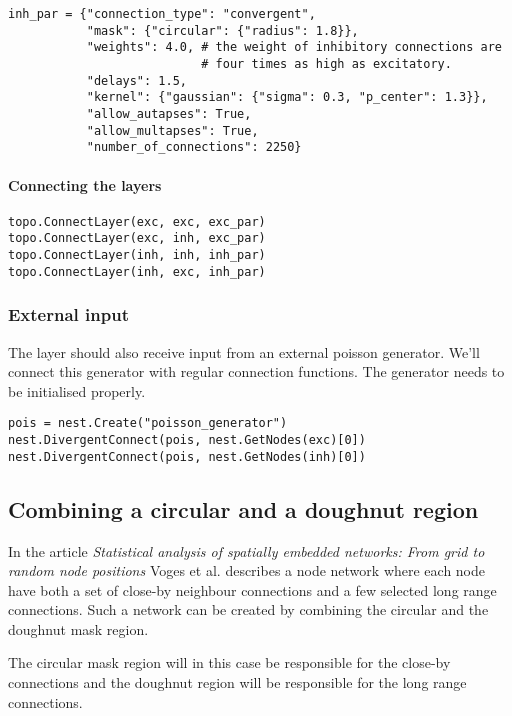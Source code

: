 \documentclass{article}
\begin{document}
\begin{verbatim}
inh_par = {"connection_type": "convergent",
           "mask": {"circular": {"radius": 1.8}},
           "weights": 4.0, # the weight of inhibitory connections are
                           # four times as high as excitatory.
           "delays": 1.5,
           "kernel": {"gaussian": {"sigma": 0.3, "p_center": 1.3}},
           "allow_autapses": True,
           "allow_multapses": True,
           "number_of_connections": 2250}
\end{verbatim}

\paragraph{Connecting the layers}

\begin{verbatim}
topo.ConnectLayer(exc, exc, exc_par)
topo.ConnectLayer(exc, inh, exc_par)
topo.ConnectLayer(inh, inh, inh_par)
topo.ConnectLayer(inh, exc, inh_par)
\end{verbatim}

\subsubsection{External input}

The layer should also receive input from an external poisson generator. We'll connect this generator with regular connection functions. The generator needs to be initialised properly.

\begin{verbatim}
pois = nest.Create("poisson_generator")
nest.DivergentConnect(pois, nest.GetNodes(exc)[0])
nest.DivergentConnect(pois, nest.GetNodes(inh)[0])
\end{verbatim}

\subsection{Combining a circular and a doughnut region}

In the article \emph{Statistical analysis of spatially embedded networks: From grid to random node positions} Voges et al. describes a node network where each node have both a set of close-by neighbour connections and a few selected long range connections. Such a network can be created by combining the circular and the doughnut mask region.

The circular mask region will in this case be responsible for the close-by connections and the doughnut region will be responsible for the long range connections. 
\end{document}
